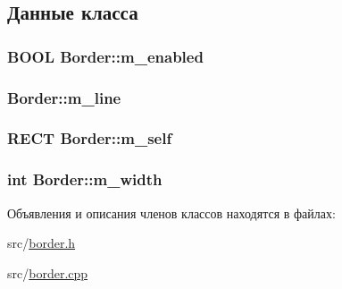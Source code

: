 \subsection{Данные класса}
\hypertarget{class_border_a63465529cd801a7697daa260e52cc156}{
\subsubsection[{m\-\_\-enabled}]{\setlength{\rightskip}{0pt plus 5cm}B\-O\-O\-L Border\-::m\-\_\-enabled\hspace{0.3cm}{\ttfamily [protected]}}}\label{class_border_a63465529cd801a7697daa260e52cc156}
\hypertarget{class_border_a77593373329183467369fb08d4818338}{
\subsubsection[{m\-\_\-line}]{ Border\-::m\-\_\-line\hspace{0.3cm}{\ttfamily [protected]}}}\label{class_border_a77593373329183467369fb08d4818338}
\hypertarget{class_border_a9abf5eb45c217515cde39e9ba877dd5d}{
\subsubsection[{m\-\_\-self}]{\setlength{\rightskip}{0pt plus 5cm}R\-E\-C\-T Border\-::m\-\_\-self\hspace{0.3cm}{\ttfamily [protected]}}}\label{class_border_a9abf5eb45c217515cde39e9ba877dd5d}
\hypertarget{class_border_a3c00eea5388d2f3bcd32d49c61200dfa}{
\subsubsection[{m\-\_\-width}]{\setlength{\rightskip}{0pt plus 5cm}int Border\-::m\-\_\-width\hspace{0.3cm}{\ttfamily [protected]}}}\label{class_border_a3c00eea5388d2f3bcd32d49c61200dfa}


Объявления и описания членов классов находятся в файлах\-:\begin{DoxyCompactItemize}
\item 
src/\hyperlink{border_8h}{border.\-h}\item 
src/\hyperlink{border_8cpp}{border.\-cpp}\end{DoxyCompactItemize}
